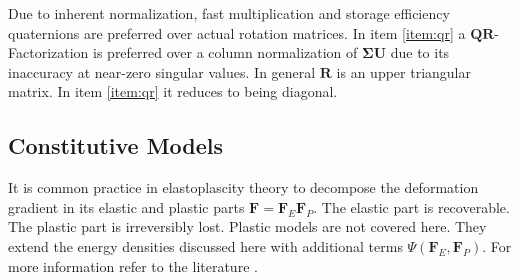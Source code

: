 \documentclass[m,times]{cgMA}
\begin{document}
Due to inherent normalization, fast multiplication and storage efficiency quaternions are preferred over actual rotation matrices. In item \ref{item:qr} a $\boldsymbol{QR}$-Factorization is preferred over a column normalization of $\boldsymbol{\Sigma U}$ due to its inaccuracy at near-zero singular values. In general $\boldsymbol{R}$ is an upper triangular matrix. In item \ref{item:qr} it reduces to being diagonal.
\cite{MPM:COURSE}\cite{SVD:3x3}

\subsection{Constitutive Models}\label{seq:constitutive_models}
It is common practice in elastoplascity theory to decompose the deformation gradient in its elastic and plastic parts $\boldsymbol{F} = \boldsymbol{F}_E \boldsymbol{F}_P$. The elastic part is recoverable. The plastic part is irreversibly lost. Plastic models are not covered here. They extend the energy densities discussed here with additional terms $\Psi(\boldsymbol{F}_E,\boldsymbol{F}_P)$. For more information refer to the literature \cite{ochsner2014elasto}.
\end{document}
